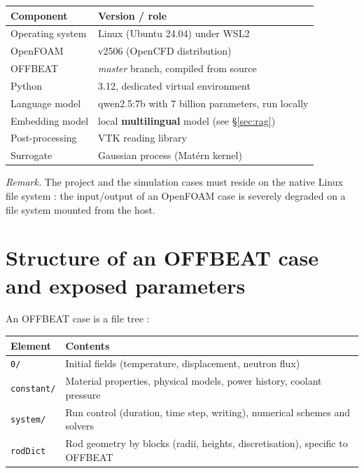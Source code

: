 \documentclass[12pt,a4paper]{report}
\begin{document}
\noindent
\begin{tabularx}{\textwidth}{@{}lX@{}}
\toprule
\textbf{Component} & \textbf{Version / role}\\
\midrule
Operating system & Linux (Ubuntu 24.04) under WSL2\\
OpenFOAM & v2506 (OpenCFD distribution)\\
OFFBEAT & \textit{master} branch, compiled from source\\
Python & 3.12, dedicated virtual environment\\
Language model & qwen2.5:7b with \num{7} billion parameters, run locally\\
Embedding model & local \textbf{multilingual} model (see §\ref{sec:rag})\\
Post-processing & VTK reading library\\
Surrogate & Gaussian process (Matérn kernel)\\
\bottomrule
\end{tabularx}

\vspace{0.5cm}

\noindent
\textit{Remark.} The project and the simulation cases must reside on the native
Linux file system : the input/output of an OpenFOAM case is severely degraded on
a file system mounted from the host.

\section{Structure of an OFFBEAT case and exposed parameters}
\label{ann:cas}

\noindent An OFFBEAT case is a file tree :

\vspace{0.3cm}
\noindent
\begin{tabularx}{\textwidth}{@{}lX@{}}
\toprule
\textbf{Element} & \textbf{Contents}\\
\midrule
\texttt{0/} & Initial fields (temperature, displacement, neutron flux)\\
\texttt{constant/} & Material properties, physical models, power history,
  coolant pressure\\
\texttt{system/} & Run control (duration, time step, writing), numerical
  schemes and solvers\\
\texttt{rodDict} & Rod geometry by blocks (radii, heights, discretisation),
  specific to OFFBEAT\\
\bottomrule
\end{tabularx}
\end{document}
